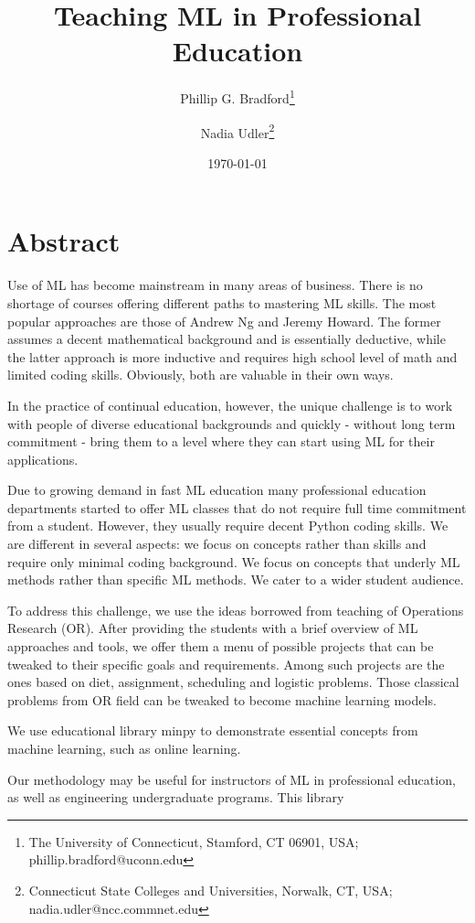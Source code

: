 \documentclass{article} %
\title{Teaching ML in Professional Education} %
\author{
 Phillip G. Bradford\thanks{ The University of Connecticut, Stamford, CT 06901, USA; phillip.bradford@uconn.edu} \and
 Nadia Udler\thanks{ Connecticut State Colleges and Universities, Norwalk, CT, USA; nadia.udler@ncc.commnet.edu} 
}
\date{\today} %
\begin{document}
    \maketitle %
    
    \section{Abstract} %
    
      Use of ML has become mainstream in many areas of business. There is no shortage of courses offering different paths to mastering ML skills. The most popular approaches are those of Andrew Ng and Jeremy Howard. The former assumes a decent mathematical background and is essentially deductive, while the latter approach is more inductive and requires high school level of math and limited coding skills. Obviously, both are valuable in their own ways.
  
 In the practice of continual education, however, the unique challenge is to work with people of diverse educational backgrounds and quickly - without long term commitment - bring them to a level where they can start using ML for their applications.
  
 Due to growing demand in fast ML education many professional education departments started to offer ML classes that do not require full time commitment from a student. However, they usually require decent Python coding skills. We are different in several aspects: we focus on concepts rather than skills and require only minimal coding background. We focus on concepts that underly ML methods rather than specific ML methods. We cater to a wider student audience.
  
 To address this challenge, we use the ideas borrowed from teaching of Operations Research (OR). After providing the students with a brief overview of ML approaches and tools, we offer them a menu of possible projects that can be tweaked to their specific goals and requirements. Among such projects are the ones based on diet, assignment, scheduling and logistic problems. Those classical problems from OR field can be tweaked to become machine learning models. 

We use educational  library minpy \cite{NU} to demonstrate essential concepts from machine learning, such as online learning. 

  
 Our methodology may be useful for instructors of ML in professional education, as well as engineering undergraduate programs. This library 
\end{document}
